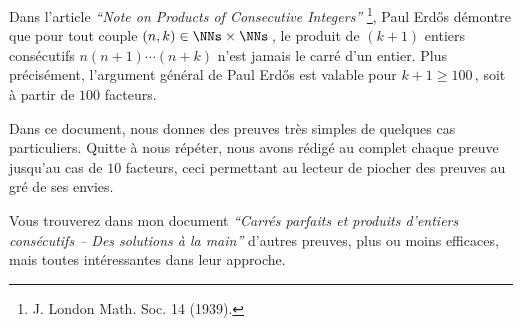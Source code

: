 Dans l'article \emph{\enquote{Note on Products of Consecutive Integers}}
\footnote{
	J. London Math. Soc. 14 (1939).
},
Paul Erdős démontre que pour tout couple $(n, k) \in \NNs \times \NNs$\,, le produit de $(k+1)$ entiers consécutifs $n (n + 1) \cdots (n + k)$ n'est jamais le carré d'un entier. 
Plus précisément, l'argument général de Paul Erdős est valable pour $k + 1 \geq 100$\,, soit à partir de $100$ facteurs.

\medskip

Dans ce document, nous donnes des preuves très simples de quelques cas particuliers. Quitte à nous répéter, nous avons rédigé au complet chaque preuve jusqu'au cas de $10$ facteurs, ceci permettant au lecteur de piocher des preuves au gré de ses envies.


\begin{remark}
	Vous trouverez dans mon document \emph{\enquote{Carrés parfaits et produits d'entiers consécutifs -- Des solutions à la main}} d'autres preuves, plus ou moins efficaces, mais toutes intéressantes dans leur approche.
\end{remark}

